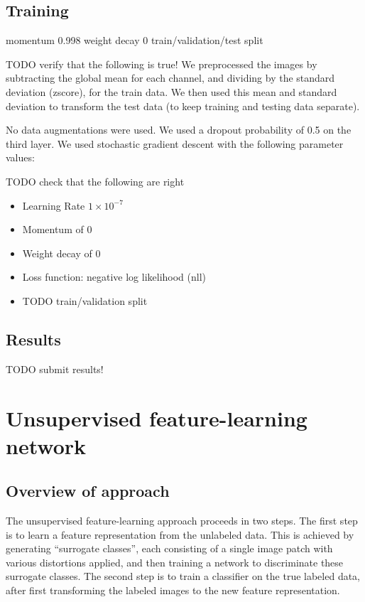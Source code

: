\documentclass{article} %
\newenvironment{itemizedense}{
\begin{itemize}
  \setlength{\itemsep}{1pt}
  \setlength{\parskip}{0pt}
  \setlength{\parsep}{0pt}
}{\end{itemize}}
\begin{document}
\subsection{Training}


momentum 0.998
weight decay 0
train/validation/test split

TODO verify that the following is true!
We preprocessed the images by subtracting the global mean for each channel, and dividing by the standard deviation (zscore), for the train data. We then used this mean and standard deviation to transform the test data (to keep training and testing data separate).

No data augmentations were used. We used a dropout probability of 0.5 on the third layer. We used stochastic gradient descent with the following parameter values:

TODO check that the following are right

\begin{itemizedense}
\item Learning Rate $1 \times 10^{-7}$
\item Momentum of $0$
\item Weight decay of $0$
\item Loss function: negative log likelihood (nll)
\item TODO train/validation split
\end{itemizedense}

\subsection{Results}

TODO submit results!

\section{Unsupervised feature-learning network}

\subsection{Overview of approach}

The unsupervised feature-learning approach proceeds in two steps. The first step is to learn a feature representation from the unlabeled data. This is achieved by generating ``surrogate classes'', each consisting of a single image patch with various distortions applied, and then training a network to discriminate these surrogate classes. The second step is to train a classifier on the true labeled data, after first transforming the labeled images to the new feature representation.
\end{document}
